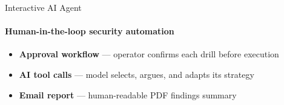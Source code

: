 
\begin{frame}{Interactive AI Agent}
  \framesubtitle{Human-in-the-loop security automation}
  \begin{itemize}
    \setlength\itemsep{0.8em}
    \item[\faUserCheck] \textbf{Approval workflow} — operator confirms each drill before execution
    \item[\faRobot] \textbf{AI tool calls} — model selects, argues, and adapts its strategy
    \item[\faEnvelope] \textbf{Email report} — human-readable PDF findings summary
  \end{itemize}
  \vspace{0.8em}
  \begin{block}{}
    \centering
  \end{block}
\end{frame}

